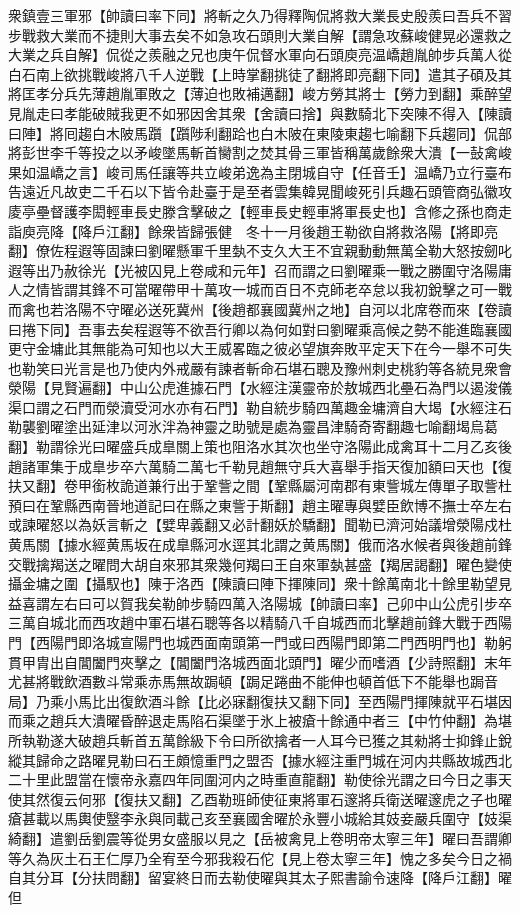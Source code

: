 衆鎮壹三軍邪【帥讀曰率下同】將斬之久乃得釋陶侃將救大業長史殷羨曰吾兵不習步戰救大業而不捷則大事去矣不如急攻石頭則大業自解【謂急攻蘇峻健晃必還救之大業之兵自解】侃從之羨融之兄也庚午侃督水軍向石頭庾亮温嶠趙胤帥步兵萬人從白石南上欲挑戰峻將八千人逆戰【上時掌翻挑徒了翻將即亮翻下同】遣其子碩及其將匡孝分兵先薄趙胤軍敗之【薄迫也敗補邁翻】峻方勞其將士【勞力到翻】乘醉望見胤走曰孝能破賊我更不如邪因舍其衆【舍讀曰捨】與數騎北下突陳不得入【陳讀曰陣】將囘趨白木陂馬躓【躓陟利翻跲也白木陂在東陵東趨七喻翻下兵趨同】侃部將彭世李千等投之以矛峻墜馬斬首臠割之焚其骨三軍皆稱萬歲餘衆大潰【一鼔禽峻果如温嶠之言】峻司馬任讓等共立峻弟逸為主閉城自守【任音壬】温嶠乃立行臺布告遠近凡故吏二千石以下皆令赴臺于是至者雲集韓晃聞峻死引兵趣石頭管商弘徽攻庱亭壘督護李閎輕車長史滕含擊破之【輕車長史輕車將軍長史也】含修之孫也商走詣庾亮降【降戶江翻】餘衆皆歸張健　冬十一月後趙王勒欲自將救洛陽【將即亮翻】僚佐程遐等固諫曰劉曜懸軍千里埶不支久大王不宜親動動無萬全勒大怒按劒叱遐等出乃赦徐光【光被囚見上卷咸和元年】召而謂之曰劉曜乘一戰之勝圍守洛陽庸人之情皆謂其鋒不可當曜帶甲十萬攻一城而百日不克師老卒怠以我初銳擊之可一戰而禽也若洛陽不守曜必送死冀州【後趙都襄國冀州之地】自河以北席卷而來【卷讀曰捲下同】吾事去矣程遐等不欲吾行卿以為何如對曰劉曜乘高候之勢不能進臨襄國更守金墉此其無能為可知也以大王威畧臨之彼必望旗奔敗平定天下在今一舉不可失也勒笑曰光言是也乃使内外戒嚴有諫者斬命石堪石聰及豫州刺史桃豹等各統見衆會滎陽【見賢遍翻】中山公虎進據石門【水經注漢靈帝於敖城西北壘石為門以遏浚儀渠口謂之石門而滎瀆受河水亦有石門】勒自統步騎四萬趣金墉濟自大堨【水經注石勒襲劉曜塗出延津以河氷泮為神靈之助號是處為靈昌津騎奇寄翻趣七喻翻堨烏葛翻】勒謂徐光曰曜盛兵成臯關上策也阻洛水其次也坐守洛陽此成禽耳十二月乙亥後趙諸軍集于成臯步卒六萬騎二萬七千勒見趙無守兵大喜舉手指天復加額曰天也【復扶又翻】卷甲銜枚詭道兼行出于鞏訾之間【鞏縣屬河南郡有東訾城左傳單子取訾杜預曰在鞏縣西南晉地道記曰在縣之東訾于斯翻】趙主曜專與嬖臣飲博不撫士卒左右或諫曜怒以為妖言斬之【嬖卑義翻又必計翻妖於驕翻】聞勒已濟河始議增滎陽戍杜黄馬關【據水經黄馬坂在成臯縣河水逕其北謂之黄馬關】俄而洛水候者與後趙前鋒交戰擒羯送之曜問大胡自來邪其衆幾何羯曰王自來軍埶甚盛【羯居謁翻】曜色變使攝金墉之圍【攝馭也】陳于洛西【陳讀曰陣下揮陳同】衆十餘萬南北十餘里勒望見益喜謂左右曰可以賀我矣勒帥步騎四萬入洛陽城【帥讀曰率】己卯中山公虎引步卒三萬自城北而西攻趙中軍石堪石聰等各以精騎八千自城西而北擊趙前鋒大戰于西陽門【西陽門即洛城宣陽門也城西面南頭第一門或曰西陽門即第二門西明門也】勒躬貫甲胄出自閶闔門夾擊之【閶闔門洛城西面北頭門】曜少而嗜酒【少詩照翻】末年尤甚將戰飲酒數斗常乘赤馬無故跼頓【跼足踡曲不能伸也頓首低下不能舉也跼音局】乃乘小馬比出復飲酒斗餘【比必寐翻復扶又翻下同】至西陽門揮陳就平石堪因而乘之趙兵大潰曜昏醉退走馬陷石渠墜于氷上被瘡十餘通中者三【中竹仲翻】為堪所執勒遂大破趙兵斬首五萬餘級下令曰所欲擒者一人耳今已獲之其勑將士抑鋒止銳縱其歸命之路曜見勒曰石王頗憶重門之盟否【據水經注重門城在河内共縣故城西北二十里此盟當在懷帝永嘉四年同圍河内之時重直龍翻】勒使徐光謂之曰今日之事天使其然復云何邪【復扶又翻】乙酉勒班師使征東將軍石邃將兵衛送曜邃虎之子也曜瘡甚載以馬輿使毉李永與同載己亥至襄國舍曜於永豐小城給其妓妾嚴兵圍守【妓渠綺翻】遣劉岳劉震等從男女盛服以見之【岳被禽見上卷明帝太寧三年】曜曰吾謂卿等久為灰土石王仁厚乃全宥至今邪我殺石佗【見上卷太寧三年】愧之多矣今日之禍自其分耳【分扶問翻】留宴終日而去勒使曜與其太子熙書諭令速降【降戶江翻】曜但